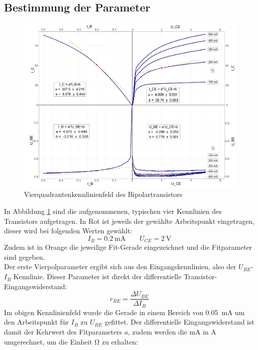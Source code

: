 \documentclass[12pt,a4paper,ngerman]{report}
\begin{document}
		\subsection{Bestimmung der Parameter}
	\begin{figure}[h]
			\centering
			\includegraphics[width=\textwidth]{plots/Vierquadrantenkennlinienfeld.pdf}
			\caption{Vierquadrantenkennlinienfeld des Bipolartransistors}
			\label{img:Vierquadranten}
	\end{figure}
	In Abbildung \ref{img:Vierquadranten} sind die aufgenommenen, typischen vier Kennlinien des Transistors aufgetragen. In Rot ist jeweils der gewählte Arbeitspunkt eingetragen, dieser wird bei folgenden Werten gewählt:
	\begin{equation}
		I_B = \SI{0.2}{\milli \ampere} \qquad U_{CE} = \SI{2}{\volt}
	\end{equation}
	Zudem ist in Orange die jeweilige Fit-Gerade eingezeichnet und die Fitparameter sind gegeben.\\
	Der erste Vierpolparameter ergibt sich aus den Eingangskennlinien, also der $U_{BE}$-$I_B$ Kennlinie. Dieser Parameter ist direkt der differentielle Transistor-Eingangswiderstand:
	\begin{equation}
		r_{BE} = \frac{\Delta U_{BE}}{\Delta I_{B}}
	\end{equation}
	Im obigen Kennlinienfeld wurde die Gerade in einem Bereich von \SI{0.05}{\milli \ampere} um den Arbeitspunkt für $I_B$ zu $U_{BE}$ gefittet. Der differentielle Eingangswiderstand ist damit der Kehrwert des Fitparameters $a$, zudem werden die \si{\milli \ampere} in \si{\ampere} umgerechnet, um die Einheit \si{\ohm} zu erhalten:
\end{document}
